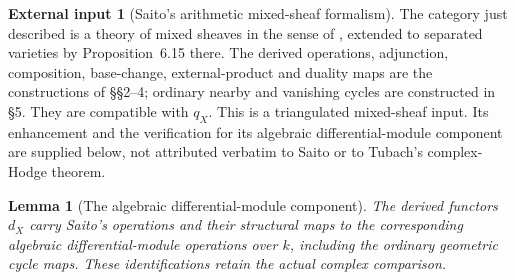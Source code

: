 \documentclass[11pt]{article}
\numberwithin{equation}{section}
\newtheorem{lemma}[lemma]{Lemma}
\theoremstyle{definition}
\newtheorem{externalinput}[externalinput]{External input}
\theoremstyle{remark}
\begin{document}
\begin{externalinput}[Saito's arithmetic mixed-sheaf formalism]
\label{input:arithmetic-mixed-sheaves}
The category just described is a theory of mixed sheaves in the sense of
\cite[\S\S1.1--1.8(ii)]{SaitoMixed}, extended to separated varieties
by Proposition~6.15 there. The derived operations, adjunction,
composition, base-change, external-product and duality maps are the
constructions of \S\S2--4; ordinary nearby and vanishing cycles are
constructed in \S5. They are compatible with $q_X$. This is a
triangulated mixed-sheaf input. Its enhancement and the verification
for its algebraic differential-module component are supplied below,
not attributed verbatim to Saito or to Tubach's complex-Hodge theorem.
\end{externalinput}

\begin{lemma}[The algebraic differential-module component]
\label{lem:arithmetic-D-operations}
The derived functors $d_X$ carry Saito's operations and their structural
maps to the corresponding algebraic differential-module operations
over $k$, including the ordinary geometric cycle maps. These
identifications retain the actual complex comparison.
\end{lemma}
\end{document}
